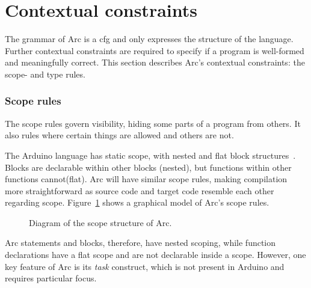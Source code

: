 \section{Contextual constraints}\label{sec:contextualconstraints}
The grammar of Arc is a \gls{cfg} and only expresses the structure of the language. Further contextual constraints are required to specify if a program is well-formed and meaningfully correct. This section describes Arc's contextual constraints: the scope- and type rules.

\subsubsection{Scope rules}
The scope rules govern visibility, hiding some parts of a program from others. It also rules where certain things are allowed and others are not.

The Arduino language has static scope, with nested and flat block structures~\cite{cppref}. Blocks are declarable within other blocks (nested), but functions within other functions cannot(flat). Arc will have similar scope rules, making compilation more straightforward as source code and target code resemble each other regarding scope. Figure~\ref{fig:arcscoperules} shows a graphical model of Arc's scope rules.


\begin{figure}[htbp]
    \centering
    \caption{Diagram of the scope structure of Arc.}
    \label{fig:arcscoperules}
\end{figure}


Arc statements and blocks, therefore, have nested scoping, while function declarations have a flat scope and are not declarable inside a scope. However, one key feature of Arc is its \textit{task} construct, which is not present in Arduino and requires particular focus.

